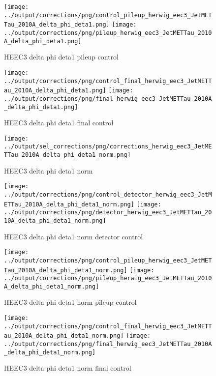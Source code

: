 \documentclass[11pt]{book}
\begin{document}
\begin{figure}[ht]
\centering
\texttt{[image: ../output/corrections/png/control\_pileup\_herwig\_eec3\_JetMETTau\_2010A\_delta\_phi\_deta1.png]}
\texttt{[image: ../output/corrections/png/pileup\_herwig\_eec3\_JetMETTau\_2010A\_delta\_phi\_deta1.png]}
\caption{HEEC3 delta phi deta1 pileup control}
\label{fig:HEEC3_JetMETTau_2010A_delta_phi_deta1_pileup_control}
\end{figure}


\begin{figure}[ht]
\centering
\texttt{[image: ../output/corrections/png/control\_final\_herwig\_eec3\_JetMETTau\_2010A\_delta\_phi\_deta1.png]}
\texttt{[image: ../output/corrections/png/final\_herwig\_eec3\_JetMETTau\_2010A\_delta\_phi\_deta1.png]}
\caption{HEEC3 delta phi deta1 final control}
\label{fig:HEEC3_JetMETTau_2010A_delta_phi_deta1_final_control}
\end{figure}


\begin{figure}[ht]
\centering
\texttt{[image: ../output/sel\_corrections/png/corrections\_herwig\_eec3\_JetMETTau\_2010A\_delta\_phi\_deta1\_norm.png]}
\caption{HEEC3 delta phi deta1 norm}
\label{fig:HEEC3_JetMETTau_2010A_delta_phi_deta1_norm}
\end{figure}

\begin{figure}[ht]
\centering
\texttt{[image: ../output/corrections/png/control\_detector\_herwig\_eec3\_JetMETTau\_2010A\_delta\_phi\_deta1\_norm.png]}
\texttt{[image: ../output/corrections/png/detector\_herwig\_eec3\_JetMETTau\_2010A\_delta\_phi\_deta1\_norm.png]}
\caption{HEEC3 delta phi deta1 norm detector control}
\label{fig:HEEC3_JetMETTau_2010A_delta_phi_deta1_norm_detector_control}
\end{figure}

\begin{figure}[ht]
\centering
\texttt{[image: ../output/corrections/png/control\_pileup\_herwig\_eec3\_JetMETTau\_2010A\_delta\_phi\_deta1\_norm.png]}
\texttt{[image: ../output/corrections/png/pileup\_herwig\_eec3\_JetMETTau\_2010A\_delta\_phi\_deta1\_norm.png]}
\caption{HEEC3 delta phi deta1 norm pileup control}
\label{fig:HEEC3_JetMETTau_2010A_delta_phi_deta1_norm_pileup_control}
\end{figure}


\begin{figure}[ht]
\centering
\texttt{[image: ../output/corrections/png/control\_final\_herwig\_eec3\_JetMETTau\_2010A\_delta\_phi\_deta1\_norm.png]}
\texttt{[image: ../output/corrections/png/final\_herwig\_eec3\_JetMETTau\_2010A\_delta\_phi\_deta1\_norm.png]}
\caption{HEEC3 delta phi deta1 norm final control}
\label{fig:HEEC3_JetMETTau_2010A_delta_phi_deta1_norm_final_control}
\end{figure}
\end{document}
